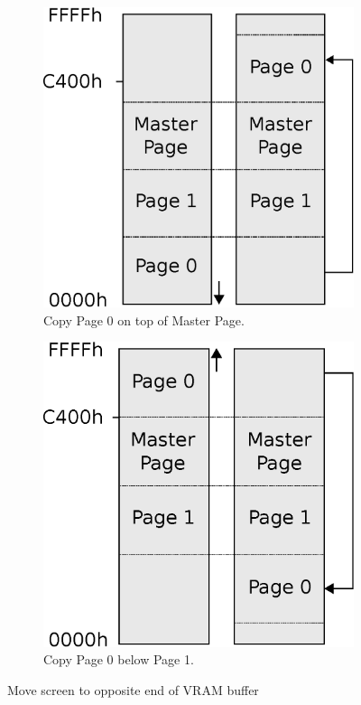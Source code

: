 \documentclass[book.tex]{subfiles}
\begin{document}
\par 
\begin{figure}[H]
\centering 
\begin{subfigure}{.5\textwidth}
  \centering
  \includegraphics[width=.8\textwidth]{imgs/drawings/Page_down_switch.eps}
  \caption*{Copy Page 0 on top of Master Page.}
  \label{fig:page0_down}
\end{subfigure}%
\begin{subfigure}{.5\textwidth}
  \centering
  \includegraphics[width=.8\textwidth]{imgs/drawings/Page_up_switch.eps}
    \caption*{Copy Page 0 below Page 1. }
  \label{fig:page0_up}
\end{subfigure}
\caption{Move screen to opposite end of VRAM buffer}
\label{fig:page_wrapping}
\end{figure}
\end{document}

